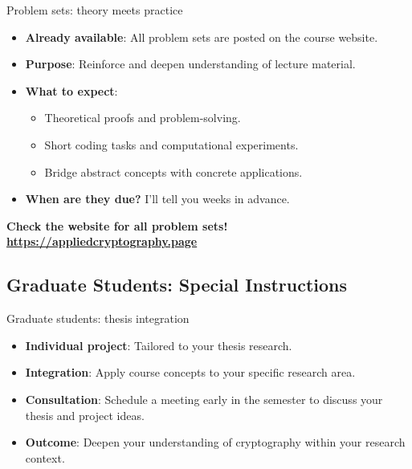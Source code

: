 \documentclass[aspectratio=169, lualatex, handout]{beamer}
\begin{document}
\begin{frame}{Problem sets: theory meets practice}
	\begin{itemize}[<+->]
		\item \textbf{Already available}: All problem sets are posted on the course website.
		\item \textbf{Purpose}: Reinforce and deepen understanding of lecture material.
		\item \textbf{What to expect}:
		      \begin{itemize}
			      \item Theoretical proofs and problem-solving.
			      \item Short coding tasks and computational experiments.
			      \item Bridge abstract concepts with concrete applications.
		      \end{itemize}
		\item \textbf{When are they due?} I'll tell you weeks in advance.
	\end{itemize}
	\vspace{0.5cm}
	\begin{center}
		\Large\textcolor{cipherprimary}{\textbf{Check the website for all problem sets! \\ \url{https://appliedcryptography.page}}}
	\end{center}
\end{frame}

\subsection{Graduate Students: Special Instructions}

\begin{frame}{Graduate students: thesis integration}
	\vspace{0.1cm}
	\begin{itemize}[<+->]
		\item \textbf{Individual project}: Tailored to your thesis research.
		\item \textbf{Integration}: Apply course concepts to your specific research area.
		\item \textbf{Consultation}: Schedule a meeting early in the semester to discuss your thesis and project ideas.
		\item \textbf{Outcome}: Deepen your understanding of cryptography within your research context.
	\end{itemize}
\end{frame}
\end{document}
